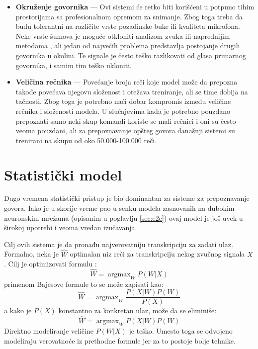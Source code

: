 \documentclass[a4paper]{article}
\DeclareMathOperator*{\argmax}{argmax}
\begin{document}
\begin{itemize}
  \item \textbf{Okruženje govornika} --- 
  Ovi sistemi će retko biti korišćeni u potpuno tihim prostorijama sa profesionalnom opremom za snimanje. Zbog toga treba da budu tolerantni na različite vrste pozadinske buke ili kvaliteta mikrofona. 
  Neke vrste šumova je moguće otkloniti analizom zvuka ili naprednijim metodama \cite{xu2015enhancement}, ali jedan od najvećih problema predstavlja postojanje drugih govornika u okolini.
  Te signale je često teško razlikovati od glasa primarnog govornika, i samim tim teško ukloniti.
  
  \item \textbf{Veličina rečnika} --- 
  Povećanje broja reči koje model može da prepozna takođe povećava njegovu složenost i otežava treniranje, ali se time dobija na tačnosti. 
  Zbog toga je potrebno naći dobar kompromis između veličine rečnika i složenosti modela. 
  U slučajevima kada je potrebno pouzdano prepoznati samo neki skup komandi koriste se mali rečnici i oni su često veoma pouzdani, ali za prepoznavanje opšteg govora današnji sistemi su trenirani na skupu od oko 50.000-100.000 reči.
\end{itemize}

\section{Statistički model}
\label{sec:statistical}

Dugo vremena statistički pristup je bio dominantan za sisteme za prepoznavanje govora.
Iako je u skorije vreme pao u senku modela zasnovanih na dubokim neuronskim mrežama (opisanim u poglavlju \ref{sec:e2e}) ovaj model je još uvek u širokoj upotrebi i veoma vredan izučavanja.

Cilj ovih sistema je da pronađu najverovatniju transkripciju za zadati ulaz.
Formalno, neka je $\hat{W}$ optimalan niz reči za transkripciju nekog zvučnog signala $X$. Cilj je optimizovati formulu \cite{kamath2019nlp}:
\begin{equation*}
  \hat{W} = \argmax_{W} P(W|X)
\end{equation*}
primenom Bajesove formule to se može zapisati kao:
\begin{equation*}
  \hat{W} = \argmax_{W} \frac{P(X|W) P(W)}{P(X)}
\end{equation*}
a kako je $P(X)$ konstantno za konkretan ulaz, može da se eliminiše:
\begin{equation}
  \label{eq:stat1}
  \hat{W} = \argmax_{W} P(X|W) P(W)
\end{equation}
Direktno modeliranje veličine $P(W|X)$ je teško. Umesto toga se odvojeno modeliraju verovatnoće iz prethodne formule jer za to postoje bolje tehnike.
\end{document}
